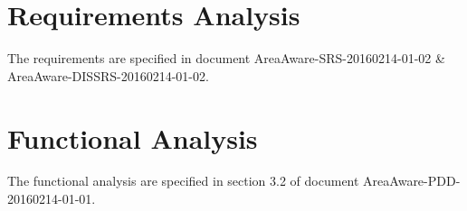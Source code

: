 \section{Requirements Analysis}
The requirements are specified in document AreaAware-SRS-20160214-01-02 \& AreaAware-DISSRS-20160214-01-02.


\section{Functional Analysis}
The functional analysis are specified in section 3.2 of document  AreaAware-PDD-20160214-01-01.



